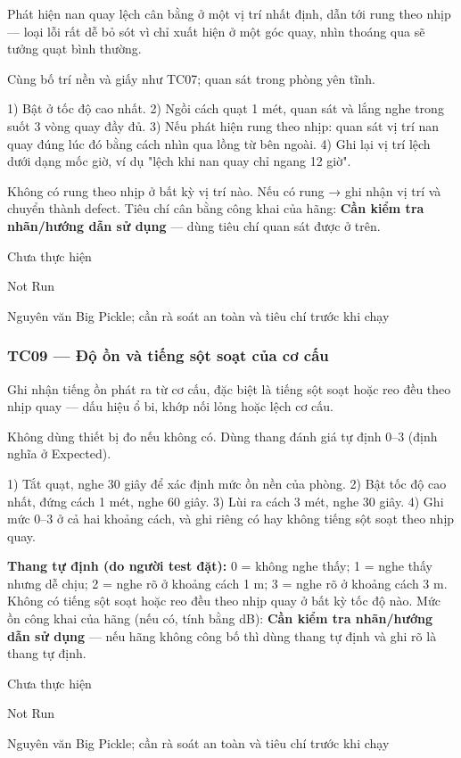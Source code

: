 \begin{description}
\tightlist
\item[Objective]
Phát hiện nan quay lệch cân bằng ở một vị trí nhất định, dẫn tới rung theo nhịp --- loại lỗi rất dễ bỏ sót vì chỉ xuất hiện ở một góc quay, nhìn thoáng qua sẽ tưởng quạt bình thường.
\item[Input]
Cùng bố trí nền và giấy như TC07; quan sát trong phòng yên tĩnh.
\item[Steps]
1) Bật ở tốc độ cao nhất. 2) Ngồi cách quạt 1 mét, quan sát và lắng nghe trong suốt 3 vòng quay đầy đủ. 3) Nếu phát hiện rung theo nhịp: quan sát vị trí nan quay đúng lúc đó bằng cách nhìn qua lồng từ bên ngoài. 4) Ghi lại vị trí lệch dưới dạng mốc giờ, ví dụ "lệch khi nan quay chỉ ngang 12 giờ".
\item[Expected]
Không có rung theo nhịp ở bất kỳ vị trí nào. Nếu có rung → ghi nhận vị trí và chuyển thành defect. Tiêu chí cân bằng công khai của hãng: \textbf{Cần kiểm tra nhãn/hướng dẫn sử dụng} --- dùng tiêu chí quan sát được ở trên.
\item[Actual]
Chưa thực hiện
\item[Verdict]
Not Run
\item[Ghi chú rà soát]
Nguyên văn Big Pickle; cần rà soát an toàn và tiêu chí trước khi chạy
\end{description}

\subsubsection{TC09 --- Độ ồn và tiếng sột soạt của cơ cấu}\label{tc09-ux111ux1ed9-ux1ed3n-vuxe0-tiux1ebfng-sux1ed9t-soux1ea1t-cux1ee7a-cux1a1-cux1ea5u}

\begin{description}
\tightlist
\item[Objective]
Ghi nhận tiếng ồn phát ra từ cơ cấu, đặc biệt là tiếng sột soạt hoặc reo đều theo nhịp quay --- dấu hiệu ổ bi, khớp nối lỏng hoặc lệch cơ cấu.
\item[Input]
Không dùng thiết bị đo nếu không có. Dùng thang đánh giá tự định 0--3 (định nghĩa ở Expected).
\item[Steps]
1) Tắt quạt, nghe 30 giây để xác định mức ồn nền của phòng. 2) Bật tốc độ cao nhất, đứng cách 1 mét, nghe 60 giây. 3) Lùi ra cách 3 mét, nghe 30 giây. 4) Ghi mức 0--3 ở cả hai khoảng cách, và ghi riêng có hay không tiếng sột soạt theo nhịp quay.
\item[Expected]
\textbf{Thang tự định (do người test đặt):} 0 = không nghe thấy; 1 = nghe thấy nhưng dễ chịu; 2 = nghe rõ ở khoảng cách 1 m; 3 = nghe rõ ở khoảng cách 3 m. Không có tiếng sột soạt hoặc reo đều theo nhịp quay ở bất kỳ tốc độ nào. Mức ồn công khai của hãng (nếu có, tính bằng dB): \textbf{Cần kiểm tra nhãn/hướng dẫn sử dụng} --- nếu hãng không công bố thì dùng thang tự định và ghi rõ là thang tự định.
\item[Actual]
Chưa thực hiện
\item[Verdict]
Not Run
\item[Ghi chú rà soát]
Nguyên văn Big Pickle; cần rà soát an toàn và tiêu chí trước khi chạy
\end{description}

